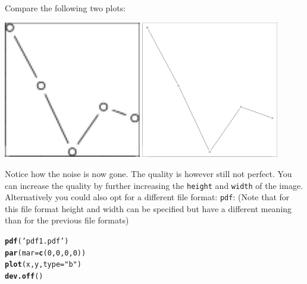 \documentclass{article}\usepackage[]{graphicx}\usepackage[]{color}
\makeatletter
\newcommand{\hlnum}[1]{\textcolor[rgb]{0.686,0.059,0.569}{#1}}%
\newcommand{\hlstr}[1]{\textcolor[rgb]{0.192,0.494,0.8}{#1}}%
\newcommand{\hlstd}[1]{\textcolor[rgb]{0.345,0.345,0.345}{#1}}%
\newcommand{\hlkwc}[1]{\textcolor[rgb]{0.333,0.667,0.333}{#1}}%
\newcommand{\hlkwd}[1]{\textcolor[rgb]{0.737,0.353,0.396}{\textbf{#1}}}%
\newenvironment{kframe}{%
 \def\at@end@of@kframe{}%
 \ifinner\ifhmode%
  \def\at@end@of@kframe{\end{minipage}}%
  \begin{minipage}{\columnwidth}%
 \fi\fi%
 \def\FrameCommand##1{\hskip\@totalleftmargin \hskip-\fboxsep
 \colorbox{shadecolor}{##1}\hskip-\fboxsep
     \hskip-\linewidth \hskip-\@totalleftmargin \hskip\columnwidth}%
 \MakeFramed {\advance\hsize-\width
   \@totalleftmargin\z@ \linewidth\hsize
   \@setminipage}}%
 {\par\unskip\endMakeFramed%
 \at@end@of@kframe}
\newenvironment{knitrout}{}{} %
\makeatother
\begin{document}
\begin{mdframed}
Compare the following two plots:
\begin{center}
\includegraphics[width=0.45\textwidth]{png1.png}
\includegraphics[width=0.45\textwidth]{png2.png}
\end{center}
Notice how the noise is now gone. The quality is however still not perfect. You can increase the quality by further increasing the \texttt{height} and \texttt{width} of the image. Alternatively you could also opt for a different file format: \texttt{pdf}: (Note that for this file format height and width can be specified but have a different meaning than for the previous file formats)
\begin{knitrout}
\color{fgcolor}\begin{kframe}
\begin{alltt}
\hlkwd{pdf}\hlstd{(}\hlstr{'pdf1.pdf'}\hlstd{)}
\hlkwd{par}\hlstd{(}\hlkwc{mar}\hlstd{=}\hlkwd{c}\hlstd{(}\hlnum{0}\hlstd{,}\hlnum{0}\hlstd{,}\hlnum{0}\hlstd{,}\hlnum{0}\hlstd{))}
\hlkwd{plot}\hlstd{(x,y,}\hlkwc{type}\hlstd{=}\hlstr{"b"}\hlstd{)}
\hlkwd{dev.off}\hlstd{()}
\end{alltt}
\end{kframe}
\end{knitrout}


\end{mdframed}
\end{document}
